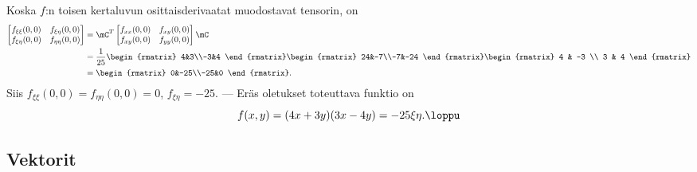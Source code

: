 Koska $f$:n toisen kertaluvun osittaisderivaatat muodostavat tensorin, on
\begin{align*}
\begin{bmatrix} 
f_{\xi\xi}(0,0) & f_{\xi\eta}(0,0) \\ f_{\xi\eta}(0,0) & f_{\eta\eta}(0,0) 
\end{bmatrix}
&=\mC^T\begin{bmatrix} f_{xx}(0,0)&f_{xy}(0,0) \\ f_{xy}(0,0)&f_{yy}(0,0) \end{bmatrix}\mC \\
&=\frac{1}{25}\begin{rmatrix} 4&3\\-3&4 \end{rmatrix} 
              \begin{rmatrix} 24&-7\\-7&-24 \end{rmatrix}
              \begin{rmatrix} 4 & -3 \\ 3 & 4 \end{rmatrix} \\
&=\begin{rmatrix} 0&-25\\-25&0 \end{rmatrix}.
\end{align*}
Siis $f_{\xi\xi}(0,0)=f_{\eta\eta}(0,0)=0$, $f_{\xi\eta}=-25$. --- Eräs oletukset toteuttava 
funktio on
\[
f(x,y)=(4x+3y)(3x-4y)=-25\xi\eta. \loppu
\]

\subsection{Vektorit}

